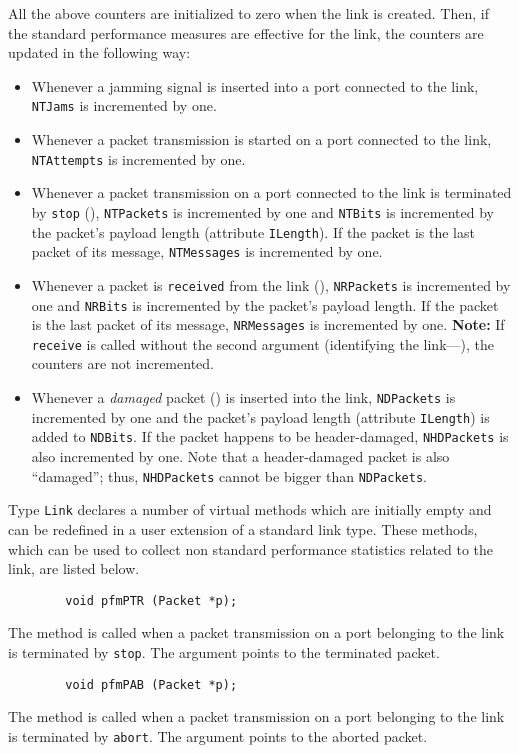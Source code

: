 All the above counters are initialized to zero when the link is created.
Then, if the standard performance measures are effective for the link, the
counters are updated in the following way:
\begin{itemize}
\item
Whenever a jamming signal is inserted into a port connected to the link,
{\tt NTJams} is incremented by one.
\item
Whenever a packet transmission is started on a port connected to the link,
{\tt NTAttempts} is incremented by one.
\item
Whenever a packet transmission on a port connected to the link is terminated
by {\tt stop}
(),
{\tt NTPackets} is incremented by one and {\tt NTBits} is incremented by
the packet's payload length (attribute {\tt ILength}).
If the packet is the last packet of its message, {\tt NTMessages} is
incremented by one.
\item
Whenever a packet is {\tt received} from the link (),
{\tt NRPackets} is incremented by one and {\tt NRBits} is incremented by
the packet's payload length.
If the packet is the last packet of its message, {\tt NRMessages} is
incremented by one.
{\bf Note:} If {\tt receive} is called without the second
argument (identifying the link---),
the counters are not incremented.
\item
Whenever a {\em damaged\/} packet () is inserted into the
link, {\tt NDPackets} is incremented by one and the packet's payload
length (attribute {\tt ILength}) is added to {\tt NDBits}.
If the packet happens to be header-damaged, {\tt NHDPackets} is
also incremented by one.
Note that a header-damaged packet is also ``damaged''; thus, {\tt NHDPackets}
cannot be bigger than {\tt NDPackets}.
\end{itemize}

Type {\tt Link} declares a number of virtual methods which are initially
empty and can be redefined in a user extension of a standard link type.
These methods, which can be used to collect non standard performance statistics
related to the link, are listed below.

\begin{verbatim}
        void pfmPTR (Packet *p);
\end{verbatim}
The method is called when a packet transmission on a port
belonging to the link is terminated by {\tt stop}.
The argument points to the terminated packet.

\begin{verbatim}
        void pfmPAB (Packet *p);
\end{verbatim}
The method is called when a packet transmission on a port
belonging to the link is terminated by {\tt abort}.
The argument points to the aborted packet.

